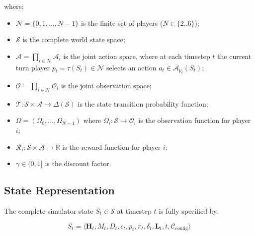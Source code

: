 \documentclass[11pt]{article}
\begin{document}
where:
\begin{itemize}
  \item $\mathcal{N} = \{0, 1, \dots, N-1\}$ is the finite set of players ($N \in \{2..6\}$);
  \item $\mathcal{S}$ is the complete world state space;
  \item $\mathcal{A} = \prod_{i \in \mathcal{N}} \mathcal{A}_i$ is the joint action space, where at each timestep $t$ the current turn player $p_t = \tau(S_t) \in \mathcal{N}$ selects an action $a_t \in \mathcal{A}_{p_t}(S_t)$;
  \item $\mathcal{O} = \prod_{i \in \mathcal{N}} \mathcal{O}_i$ is the joint observation space;
  \item $\mathcal{T}: \mathcal{S} \times \mathcal{A} \to \Delta(\mathcal{S})$ is the state transition probability function;
  \item $\Omega = (\Omega_0, \dots, \Omega_{N-1})$ where $\Omega_i: \mathcal{S} \to \mathcal{O}_i$ is the observation function for player $i$;
  \item $\mathcal{R}_i: \mathcal{S} \times \mathcal{A} \to \mathbb{R}$ is the reward function for player $i$;
  \item $\gamma \in (0, 1]$ is the discount factor.
\end{itemize}

\subsection{State Representation}
The complete simulator state $S_t \in \mathcal{S}$ at timestep $t$ is fully specified by:

\[
S_t = \langle \mathbf{H}_t, M_t, D_t, c_t, p_t, \pi_t, \delta_t, \mathbf{L}_t, t, \mathcal{C}_{\text{config}} \rangle
\]
\end{document}
